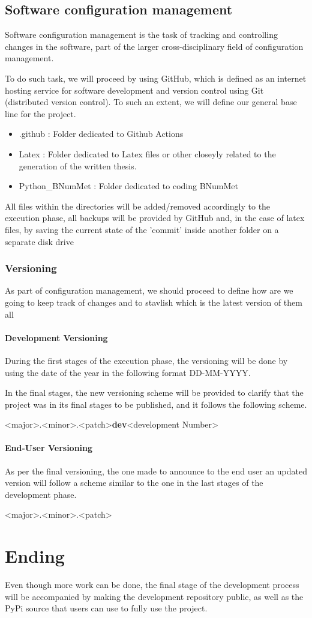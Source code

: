\subsection{Software configuration management}
Software configuration management is the task of tracking and controlling changes in the software, part of the larger cross-disciplinary field of configuration management.\cite{Pre94}

To do such task, we will proceed by using GitHub, which is defined as an internet hosting service for software development and version control using Git (distributed version control). To such an extent, we will define our general base line for the project.
\begin{itemize}
    \item .github : Folder dedicated to Github Actions
    \item Latex : Folder dedicated to Latex files or other closeyly related to the generation of the written thesis.
    \item Python\_BNumMet : Folder dedicated to coding BNumMet
\end{itemize}

All files within the directories will be added/removed accordingly to the execution phase, all backups will be provided by GitHub and, in the case of latex files, by saving the current state of the 'commit' inside another folder on a separate disk drive
\subsubsection{Versioning}
As part of configuration management, we should proceed to define how are we going to keep track of changes and to stavlish which is the latest version of them all
\paragraph{Development Versioning}
During the first stages of the execution phase, the versioning will be done by using the date of the year in the following format DD-MM-YYYY.

In the final stages, the new versioning scheme will be provided to clarify that the project was in its final stages to be published, and it follows the following scheme.
\begin{center}
    <major>.<minor>.<patch>\textbf{dev}<development Number>
\end{center}
\paragraph{End-User Versioning}
As per the final versioning, the one made to announce to the end user an updated version will follow a scheme similar to the one in the last stages of the development phase.
\begin{center}
    <major>.<minor>.<patch>
\end{center}



\section{Ending}
Even though more work can be done, the final stage of the development process will be accompanied by making the development repository public, as well as the PyPi source that users can use to fully use the project. 

